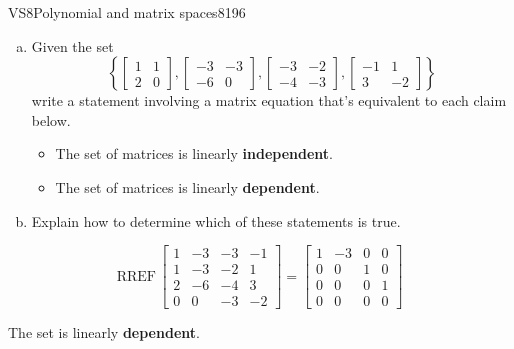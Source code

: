 \begin{exercise}{VS8}{Polynomial and matrix spaces}{8196} 
\begin{exerciseStatement} 

\begin{enumerate}[(a)]
\item  

 Given the set \[\left\{ \left[\begin{array}{cc}
1 & 1 \\
2 & 0
\end{array}\right] , \left[\begin{array}{cc}
-3 & -3 \\
-6 & 0
\end{array}\right] , \left[\begin{array}{cc}
-3 & -2 \\
-4 & -3
\end{array}\right] , \left[\begin{array}{cc}
-1 & 1 \\
3 & -2
\end{array}\right] \right\}\] write a statement involving a matrix equation that's equivalent to each claim below. 

 

\begin{itemize}
\item  

 The set of matrices is linearly \textbf{independent}. 

 
\item  

 The set of matrices is linearly \textbf{dependent}. 

 
\end{itemize}

     
\item  

 Explain how to determine which of these statements is true. 

 
\end{enumerate}

     \end{exerciseStatement}
 \begin{exerciseAnswer} 

 \[
\mathrm{RREF}\, \left[\begin{array}{cccc}
1 & -3 & -3 & -1 \\
1 & -3 & -2 & 1 \\
2 & -6 & -4 & 3 \\
0 & 0 & -3 & -2
\end{array}\right] = \left[\begin{array}{cccc}
1 & -3 & 0 & 0 \\
0 & 0 & 1 & 0 \\
0 & 0 & 0 & 1 \\
0 & 0 & 0 & 0
\end{array}\right]
            \] 

 

 The set is linearly \textbf{dependent}. 

 \end{exerciseAnswer}
 \end{exercise}


